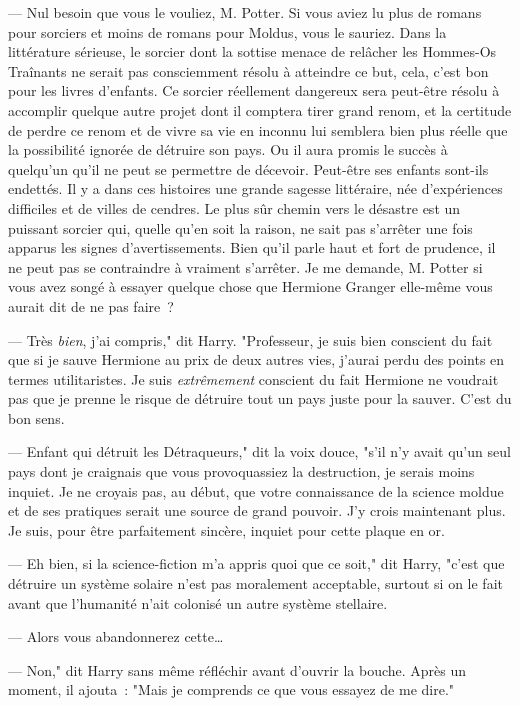 --- Nul besoin que vous le vouliez, M. Potter. Si vous aviez lu plus de romans pour sorciers et moins de romans pour Moldus, vous le sauriez. Dans la littérature sérieuse, le sorcier dont la sottise menace de relâcher les Hommes-Os Traînants ne serait pas consciemment résolu à atteindre ce but, cela, c'est bon pour les livres d'enfants. Ce sorcier réellement dangereux sera peut-être résolu à accomplir quelque autre projet dont il comptera tirer grand renom, et la certitude de perdre ce renom et de vivre sa vie en inconnu lui semblera bien plus réelle que la possibilité ignorée de détruire son pays. Ou il aura promis le succès à quelqu'un qu'il ne peut se permettre de décevoir. Peut-être ses enfants sont-ils endettés. Il y a dans ces histoires une grande sagesse littéraire, née d'expériences difficiles et de villes de cendres. Le plus sûr chemin vers le désastre est un puissant sorcier qui, quelle qu'en soit la raison, ne sait pas s'arrêter une fois apparus les signes d'avertissements. Bien qu'il parle haut et fort de prudence, il ne peut pas se contraindre à vraiment s'arrêter. Je me demande, M. Potter si vous avez songé à essayer quelque chose que Hermione Granger elle-même vous aurait dit de ne pas faire~?

--- Très \emph{bien}, j'ai compris," dit Harry. "Professeur, je suis bien conscient du fait que si je sauve Hermione au prix de deux autres vies, j'aurai perdu des points en termes utilitaristes. Je suis \emph{extrêmement} conscient du fait Hermione ne voudrait pas que je prenne le risque de détruire tout un pays juste pour la sauver. C'est du bon sens.

--- Enfant qui détruit les Détraqueurs," dit la voix douce, "s'il n'y avait qu'un seul pays dont je craignais que vous provoquassiez la destruction, je serais moins inquiet. Je ne croyais pas, au début, que votre connaissance de la science moldue et de ses pratiques serait une source de grand pouvoir. J'y crois maintenant plus. Je suis, pour être parfaitement sincère, inquiet pour cette plaque en or.

--- Eh bien, si la science-fiction m'a appris quoi que ce soit," dit Harry, "c'est que détruire un système solaire n'est pas moralement acceptable, surtout si on le fait avant que l'humanité n'ait colonisé un autre système stellaire.

--- Alors vous abandonnerez cette…

--- Non," dit Harry sans même réfléchir avant d'ouvrir la bouche. Après un moment, il ajouta~: "Mais je comprends ce que vous essayez de me dire."

